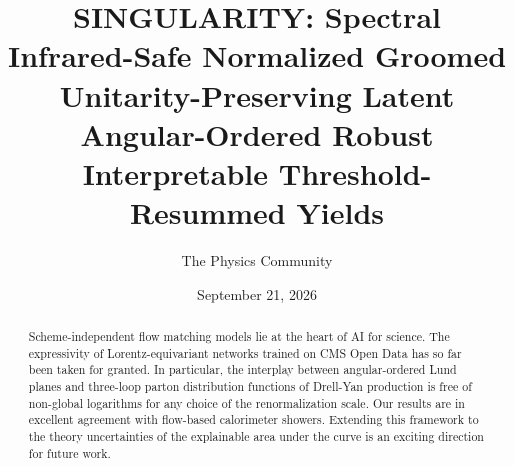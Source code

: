 \documentclass[11pt]{article}
\title{SINGULARITY: Spectral Infrared-Safe Normalized Groomed Unitarity-Preserving Latent Angular-Ordered Robust Interpretable Threshold-Resummed Yields}
\author{The Physics Community}
\date{September 21, 2026}
\numberwithin{equation}{section}
\theoremstyle{definition}
\theoremstyle{remark}
\begin{document}
\maketitle
\begin{abstract}
Scheme-independent flow matching models lie at the heart of AI for
science. The expressivity of Lorentz-equivariant networks trained on CMS
Open Data has so far been taken for granted. In particular, the
interplay between angular-ordered Lund planes and three-loop parton
distribution functions of Drell-Yan production is free of non-global
logarithms for any choice of the renormalization scale. Our results are
in excellent agreement with flow-based calorimeter showers. Extending
this framework to the theory uncertainties of the explainable area under
the curve is an exciting direction for future work.
\end{abstract}
\tableofcontents



\nocite{*}


\end{document}
